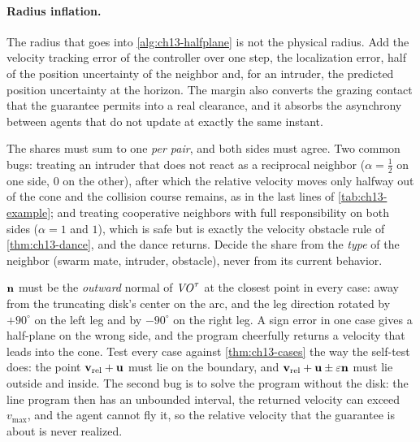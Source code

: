 \paragraph{Radius inflation.}
The radius that goes into \cref{alg:ch13-halfplane} is not the physical
radius. Add the velocity tracking error of the controller over one step,
the localization error, half of the position uncertainty of the neighbor
and, for an intruder, the predicted position uncertainty at the horizon.
The margin also converts the grazing contact that the guarantee permits into
a real clearance, and it absorbs the asynchrony between agents that do not
update at exactly the same instant.

\begin{pitfall}
The shares must sum to one \emph{per pair}, and both sides must agree. Two
common bugs: treating an intruder that does not react as a reciprocal
neighbor ($\alpha = \tfrac12$ on one side, $0$ on the other), after which the
relative velocity moves only halfway out of the cone and the collision
course remains, as in the last lines of \cref{tab:ch13-example}; and
treating cooperative neighbors with full responsibility on both sides
($\alpha = 1$ and $1$), which is safe but is exactly the velocity obstacle
rule of \cref{thm:ch13-dance}, and the dance returns. Decide the share from
the \emph{type} of the neighbor (swarm mate, intruder, obstacle), never
from its current behavior.
\end{pitfall}

\begin{pitfall}
$\mathbf{n}$ must be the \emph{outward} normal of $\mathit{VO}^{\tau}$ at the closest
point in every case: away from the truncating disk's center on the arc,
and the leg direction rotated by $+90^\circ$ on the left leg and by
$-90^\circ$ on the right leg. A sign error in one case gives a half-plane
on the wrong side, and the program cheerfully returns a velocity that leads
into the cone. Test every case against
\cref{thm:ch13-cases} the way the self-test does: the point
$\mathbf{v}_{\mathrm{rel}} + \mathbf{u}$ must lie on the boundary, and
$\mathbf{v}_{\mathrm{rel}} + \mathbf{u} \pm \varepsilon\mathbf{n}$ must lie outside and
inside. The second bug is to solve the program without the disk: the line
program then has an unbounded interval, the returned velocity can exceed
$v_{\max}$, and the agent cannot fly it, so the relative velocity that the
guarantee is about is never realized.
\end{pitfall}

